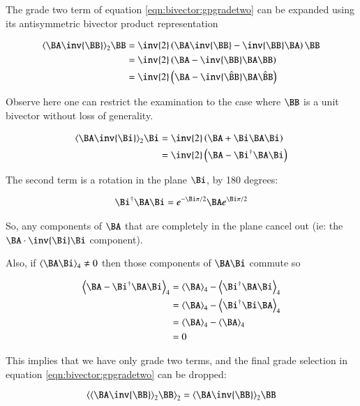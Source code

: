 The grade two term of equation \ref{eqn:bivector:gpgradetwo} can be expanded using its antisymmetric bivector product representation

\begin{align*}
\gpgradetwo{\BA\inv{\BB}} \BB
&= \inv{2}\left(\BA\inv{\BB} - \inv{\BB}\BA\right) \BB \\
&= \inv{2}\left(\BA - \inv{\BB}\BA \BB\right) \\
&= \inv{2}\left(\BA - \inv{\hat{\BB}}\BA \hat{\BB}\right) \\
\end{align*}

Observe here one can restrict the examination to the case where $\BB$ is a unit bivector without loss of generality.

\begin{align*}
\gpgradetwo{\BA\inv{\Bi}} \Bi
&= \inv{2}\left(\BA + \Bi\BA\Bi\right) \\
&= \inv{2}\left(\BA - \Bi^\dagger\BA\Bi\right) \\
\end{align*}

The second term is a rotation in the plane $\Bi$, by 180 degrees:

\begin{align*}
\Bi^\dagger\BA\Bi = e^{-\Bi \pi/2}\BA e^{\Bi \pi/2}
\end{align*}

So, any components of $\BA$ that are completely in the plane cancel out (ie: the $\BA \cdot \inv{\Bi}\Bi$ component).

Also, if $\gpgradefour{\BA \Bi} \ne 0$ then those components of $\BA \Bi$ commute so

\begin{align*}
\gpgradefour{\BA - \Bi^\dagger\BA\Bi}
&= \gpgradefour{\BA} - \gpgradefour{\Bi^\dagger\BA\Bi} \\
&= \gpgradefour{\BA} - \gpgradefour{\Bi^\dagger\Bi\BA} \\
&= \gpgradefour{\BA} - \gpgradefour{\BA} \\
&= 0 \\
\end{align*}

This implies that we have only grade two terms, and the final grade selection in equation \ref{eqn:bivector:gpgradetwo} can be dropped:

\begin{equation} \label{eqn:bivector:simplergpgradetwo}
\gpgradetwo{\gpgradetwo{\BA\inv{\BB}} \BB} = \gpgradetwo{\BA\inv{\BB}} \BB
\end{equation}


